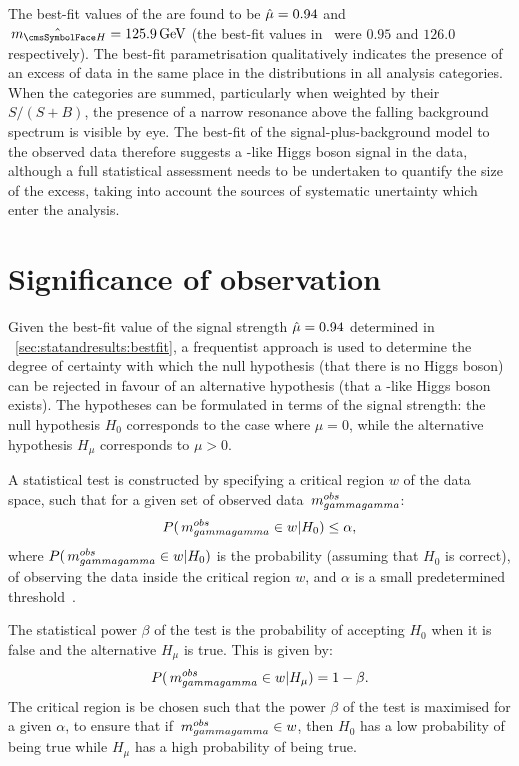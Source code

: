 The best-fit values of the \POI\s are found to be $\hat{\mu}=0.94$ and $\hat{\mH}= \bestFitGlobalMH\GeV$ (the best-fit values in~\cite{CMS-PAS-HIG-16-020} were $0.95$ and $126.0$ respectively). The best-fit parametrisation qualitatively indicates the presence of an excess of data in the same place in the \mgg distributions in all analysis categories. When the categories are summed, particularly when weighted by their $S/(S+B)$, the presence of a narrow resonance above the falling background spectrum is visible by eye. The best-fit of the signal-plus-background model to the observed data therefore suggests a \SM-like Higgs boson signal in the data, although a full statistical assessment needs to be undertaken to quantify the size of the excess, taking into account the sources of systematic unertainty which enter the analysis. 


\section{Significance of observation}
\label{sec:statandresults:significance}

Given the best-fit value of the signal strength $\hat{\mu}= 0.94$ determined in \Sec~\ref{sec:statandresults:bestfit}, a frequentist approach is used to determine the degree of certainty with which the null hypothesis (that there is no Higgs boson) can be rejected in favour of an alternative hypothesis (that a \SM-like Higgs boson exists). The hypotheses can be formulated in terms of the signal strength: the null hypothesis $H_{0}$ corresponds to the case where $\mu=0$, while the alternative hypothesis $H_{\mu}$ corresponds to $\mu > 0$. 

A statistical test is constructed by specifying a critical region $w$ of the data space, such that for a given set of observed data $\,m_{gammagamma}^{obs}$:
\begin{equation}
P(\,m_{gammagamma}^{obs} \in w | H_{0} ) \leq \alpha,
\end{equation}
where $P(\,m_{gammagamma}^{obs} \in w | H_{0} ) $ is the probability (assuming that $H_{0}$ is correct), of observing the data inside the critical region $w$, and $\alpha$ is a small predetermined threshold~\cite{Cowan}. 

The statistical power $\beta$ of the test is the probability of accepting $H_{0}$ when it is false and the alternative $H_{\mu} $ is true. This is given by:
\begin{equation}
P(\,m_{gammagamma}^{obs} \in w | H_{\mu} ) = 1 - \beta.
\end{equation}
The critical region is be chosen such that the power $\beta$ of the test is maximised for a given $\alpha$, to ensure that if $\,m_{gammagamma}^{obs} \in w$, then $H_{0}$ has a low probability of being true while $H_{\mu}$ has a high probability of being true. 

